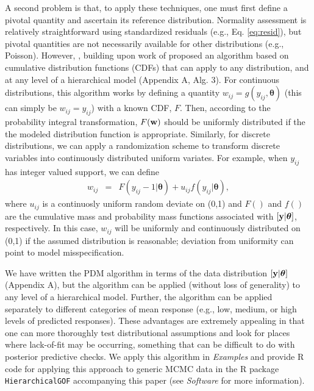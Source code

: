 \documentclass[12pt,english]{article}
\begin{document}
\begin{spacing}{1.9}
A second problem is that, to apply these techniques, one must first
define a pivotal quantity and ascertain its reference
distribution. Normality assessment is relatively straightforward using
standardized residuals (e.g., Eq. \ref{eq:resid}), but pivotal
quantities are not necessarily available for other distributions
(e.g., Poisson).  However, \citet{YuanJohnson2012}, building upon work
of \citet{Johnson2004} proposed an algorithm based on cumulative
distribution functions (CDFs) that can apply to any distribution, and
at any level of a hierarchical model (Appendix A, Alg. 3).  For
continuous distributions, this algorithm works by defining a quantity
$w_{ij} = g(y_{ij},\boldsymbol{\theta})$ (this can simply be
$w_{ij}=y_{ij}$) with a known CDF, $F$.  Then, according to the
probability integral transformation, $F({\bf w})$ should be uniformly
distributed if the the modeled distribution function is appropriate.
Similarly, for discrete distributions, we can apply a randomization
scheme \citep{Smith1985,YuanJohnson2012} to transform discrete
variables into continuously distributed uniform variates.  For
example, when $y_{ij}$ has integer valued support, we can define
\begin{eqnarray*}
  w_{ij} & = & F(y_{ij}-1|\boldsymbol{\theta}) + u_{ij} f(y_{ij}|\boldsymbol{\theta}),
\end{eqnarray*}
where $u_{ij}$ is a continuosly uniform random deviate on (0,1) and
$F()$ and $f()$ are the cumulative mass and probability mass functions
associated with $[{\bf y} | \boldsymbol{\theta}]$, respectively.  In
this case, $w_{ij}$ will be uniformly and continuously distributed on
(0,1) if the assumed distribution is reasonable; deviation from
uniformity can point to model misspecification.

We have written the PDM algorithm in terms of the data distribution
$[{\bf y} | \boldsymbol{\theta}]$ (Appendix A), but the algorithm can
be applied (without loss of generality) to any level of a hierarchical
model. Further, the algorithm can be applied separately to different
categories of mean response (e.g., low, medium, or high levels of
predicted responses). These advantages are extremely appealing in that
one can more thoroughly test distributional assumptions and look for
places where lack-of-fit may be occurring, something that can be
difficult to do with posterior predictive checks.  We apply this
algorithm in \textit{Examples} and provide R code for applying this
approach to generic MCMC data in the R package
\texttt{HierarchicalGOF} accompanying this paper (see
\textit{Software} for more information).




\end{spacing}
\end{document}
